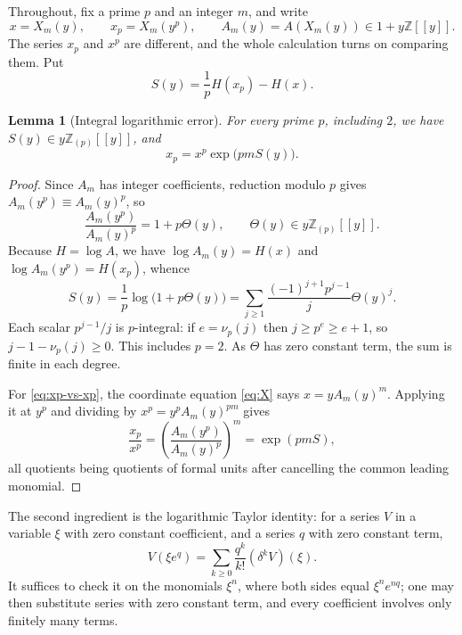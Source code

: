 \documentclass[11pt,letterpaper]{article}
\numberwithin{equation}{section}
\newtheorem{lemma}[theorem]{Lemma}
\theoremstyle{definition}
\newcommand{\Z}{\mathbb Z}
\newcommand{\Zp}{\Z_{(p)}}
\newcommand{\dd}{\delta}
\begin{document}
Throughout, fix a prime $p$ and an integer $m$, and write
\begin{equation}\label{eq:x-and-xp}
x=X_m(y),\qquad
x_p=X_m(y^p),\qquad
A_m(y)=A(X_m(y))\in1+y\Z[[y]].
\end{equation}
The series $x_p$ and $x^p$ are different, and the whole calculation turns
on comparing them. Put
\begin{equation}\label{eq:S}
S(y)=\frac1pH(x_p)-H(x).
\end{equation}

\begin{lemma}[Integral logarithmic error]\label{lem:log-error}
For every prime $p$, including $2$, we have $S(y)\in y\Zp[[y]]$, and
\begin{equation}\label{eq:xp-vs-xp}
x_p=x^p\exp\bigl(pmS(y)\bigr).
\end{equation}
\end{lemma}

\begin{proof}
Since $A_m$ has integer coefficients, reduction modulo $p$ gives
$A_m(y^p)\equiv A_m(y)^p$, so
\[
\frac{A_m(y^p)}{A_m(y)^p}=1+p\Theta(y),
\qquad\Theta(y)\in y\Zp[[y]].
\]
Because $H=\log A$, we have $\log A_m(y)=H(x)$ and
$\log A_m(y^p)=H(x_p)$, whence
\[
S(y)=\frac1p\log\bigl(1+p\Theta(y)\bigr)
     =\sum_{j\geq1}\frac{(-1)^{j+1}p^{j-1}}{j}\Theta(y)^j.
\]
Each scalar $p^{j-1}/j$ is $p$-integral: if $e=\nu_p(j)$ then
$j\geq p^e\geq e+1$, so $j-1-\nu_p(j)\geq0$. This includes $p=2$. As
$\Theta$ has zero constant term, the sum is finite in each degree.

For \eqref{eq:xp-vs-xp}, the coordinate equation \eqref{eq:X} says
$x=yA_m(y)^m$. Applying it at $y^p$ and dividing by
$x^p=y^pA_m(y)^{pm}$ gives
\[
\frac{x_p}{x^p}=\left(\frac{A_m(y^p)}{A_m(y)^p}\right)^{m}
=\exp(pmS),
\]
all quotients being quotients of formal units after cancelling the common
leading monomial.
\end{proof}

The second ingredient is the logarithmic Taylor identity: for a series
$V$ in a variable $\xi$ with zero constant coefficient, and a series $q$
with zero constant term,
\begin{equation}\label{eq:log-taylor}
V(\xi e^{q})=\sum_{k\geq0}\frac{q^k}{k!}(\dd^kV)(\xi).
\end{equation}
It suffices to check it on the monomials $\xi^n$, where both sides equal
$\xi^ne^{nq}$; one may then substitute series with zero constant term,
and every coefficient involves only finitely many terms.
\end{document}
